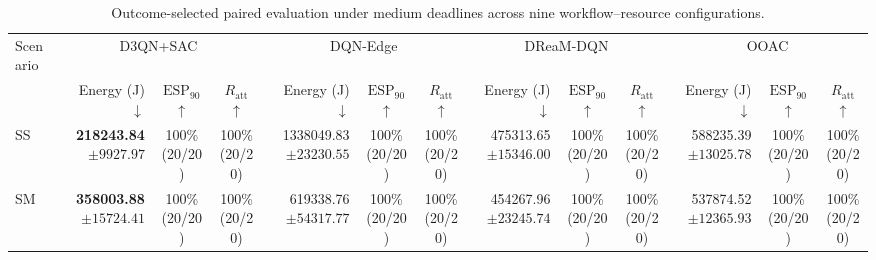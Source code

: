 \documentclass[10pt]{article}
\begin{document}
\begin{table}[!htbp]
\centering
\caption{Outcome-selected paired evaluation under medium deadlines across nine workflow--resource configurations.}
\label{tab:conditional_full_medium}
\begingroup
\footnotesize
\setlength{\tabcolsep}{2.2pt}
\renewcommand{\arraystretch}{1.08}
\begin{tabular}{@{}l*{4}{rcc}@{}}
\toprule
Scenario & \multicolumn{3}{c}{D3QN+SAC} & \multicolumn{3}{c}{DQN-Edge} & \multicolumn{3}{c}{DReaM-DQN} & \multicolumn{3}{c}{OOAC} \\
\cmidrule(lr){2-4}\cmidrule(lr){5-7}\cmidrule(lr){8-10}\cmidrule(lr){11-13}
 & Energy (J) $\downarrow$ & $\mathrm{ESP}_{90}$ $\uparrow$ & $R_{\mathrm{att}}$ $\uparrow$ & Energy (J) $\downarrow$ & $\mathrm{ESP}_{90}$ $\uparrow$ & $R_{\mathrm{att}}$ $\uparrow$ & Energy (J) $\downarrow$ & $\mathrm{ESP}_{90}$ $\uparrow$ & $R_{\mathrm{att}}$ $\uparrow$ & Energy (J) $\downarrow$ & $\mathrm{ESP}_{90}$ $\uparrow$ & $R_{\mathrm{att}}$ $\uparrow$ \\
\midrule
SS & \shortstack[r]{\textbf{218243.84}\\$\pm 9927.97$} & \shortstack[c]{100\%\\(20/20)} & \shortstack[c]{100\%\\(20/20)} & \shortstack[r]{1338049.83\\$\pm 23230.55$} & \shortstack[c]{100\%\\(20/20)} & \shortstack[c]{100\%\\(20/20)} & \shortstack[r]{475313.65\\$\pm 15346.00$} & \shortstack[c]{100\%\\(20/20)} & \shortstack[c]{100\%\\(20/20)} & \shortstack[r]{588235.39\\$\pm 13025.78$} & \shortstack[c]{100\%\\(20/20)} & \shortstack[c]{100\%\\(20/20)} \\
SM & \shortstack[r]{\textbf{358003.88}\\$\pm 15724.41$} & \shortstack[c]{100\%\\(20/20)} & \shortstack[c]{100\%\\(20/20)} & \shortstack[r]{619338.76\\$\pm 54317.77$} & \shortstack[c]{100\%\\(20/20)} & \shortstack[c]{100\%\\(20/20)} & \shortstack[r]{454267.96\\$\pm 23245.74$} & \shortstack[c]{100\%\\(20/20)} & \shortstack[c]{100\%\\(20/20)} & \shortstack[r]{537874.52\\$\pm 12365.93$} & \shortstack[c]{100\%\\(20/20)} & \shortstack[c]{100\%\\(20/20)} \\

\end{tabular}
\end{table}
\end{document}
